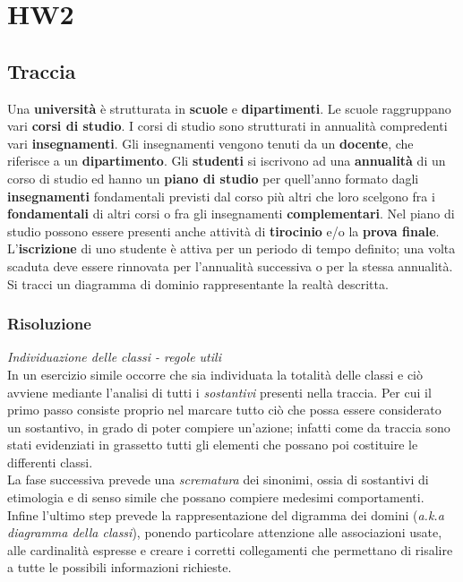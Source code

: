 \documentclass{article}
\begin{document}
\pagestyle{empty}

\section*{HW2}
\large

\subsection*{Traccia}
\large
Una \textbf{università} è strutturata in \textbf{scuole} e \textbf{dipartimenti}. Le scuole raggruppano vari \textbf{corsi di studio}. I corsi di studio sono strutturati in annualità compredenti vari \textbf{insegnamenti}. Gli insegnamenti vengono tenuti da un \textbf{docente}, che riferisce a un \textbf{dipartimento}. Gli \textbf{studenti} si iscrivono ad una \textbf{annualità} di un corso di studio ed hanno un \textbf{piano di studio} per quell'anno formato dagli \textbf{insegnamenti} fondamentali previsti dal corso più altri che loro scelgono fra i \textbf{fondamentali} di altri corsi o fra gli insegnamenti \textbf{complementari}. Nel piano di studio possono essere presenti anche attività di \textbf{tirocinio} e/o la \textbf{prova finale}. L'\textbf{iscrizione} di uno studente è attiva per un periodo di tempo definito; una volta scaduta deve essere rinnovata per l'annualità successiva o per la stessa annualità. Si tracci un diagramma di dominio rappresentante la realtà descritta.

\subsubsection*{Risoluzione}
\large
\textit{Individuazione delle classi - regole utili}\\
In un esercizio simile occorre che sia individuata la totalità delle classi e ciò avviene mediante l'analisi di tutti i \textit{sostantivi} presenti nella traccia. Per cui il primo passo consiste proprio nel marcare tutto ciò che possa essere considerato un sostantivo, in grado di poter compiere un'azione; infatti come da traccia sono stati evidenziati in grassetto tutti gli elementi che possano poi costituire le differenti classi.\vspace*{14pt}\\
La fase successiva prevede una \textit{scrematura} dei sinonimi, ossia di sostantivi di etimologia e di senso simile che possano compiere medesimi comportamenti.\vspace*{14pt}\\
Infine l'ultimo step prevede la rappresentazione del digramma dei domini (\textit{a.k.a diagramma della classi}), ponendo particolare attenzione alle associazioni usate, alle cardinalità espresse e creare i corretti collegamenti che permettano di risalire a tutte le possibili informazioni richieste.
\end{document}
